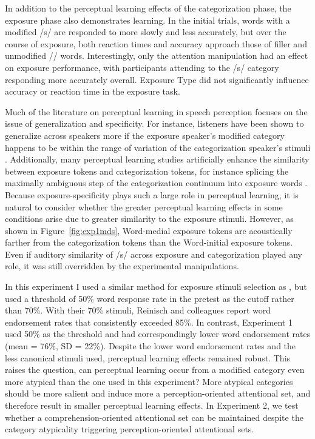 In addition to the perceptual learning effects of the categorization phase, the exposure phase also demonstrates learning.  
In the initial trials, words with a modified /s/ are responded to more slowly and less accurately, but over the course of exposure, both reaction times and accuracy approach those of filler and unmodified /\textesh/ words.
Interestingly, only the attention manipulation had an effect on exposure performance, with participants attending to the /s/ category responding more accurately overall.
Exposure Type did not significantly influence accuracy or reaction time in the exposure task.

Much of the literature on perceptual learning in speech perception focuses on the issue of generalization and specificity.
For instance, listeners have been shown to generalize across speakers more if the exposure speaker's modified category happens to be within the range of variation of the categorization speaker's stimuli \citep{Eisner2005,Kraljic2005}.
Additionally, many perceptual learning studies artificially enhance the similarity between exposure tokens and categorization tokens, for instance splicing the maximally ambiguous step of the categorization continuum into exposure words \citep{Norris2003}.
Because exposure-specificity plays such a large role in perceptual learning, it is natural to consider whether the greater perceptual learning effects in some conditions arise due to greater similarity to the exposure stimuli.
However, as shown in Figure~\ref{fig:exp1mds}, Word-medial exposure tokens are acoustically farther from the categorization tokens than the Word-initial exposure tokens.  
Even if auditory similarity of /s/ across exposure and categorization played any role, it was still overridden by the experimental manipulations.

In this experiment I used a similar method for exposure stimuli selection as \citet{Reinisch2013}, but used a threshold of 50\% word response rate in the pretest as the cutoff rather than 70\%.
With their 70\% stimuli, Reinisch and colleagues report word endorsement rates that consistently exceeded 85\%.
In contrast, Experiment 1 used 50\% as the threshold and had correspondingly lower word endorsement rates (mean = 76\%, SD = 22\%).  
Despite the lower word endorsement rates and the less canonical stimuli used, perceptual learning effects remained robust.
This raises the question, can perceptual learning occur from a modified category even more atypical than the one used in this experiment?
More atypical categories should be more salient and induce more a perception-oriented attentional set, and therefore result in smaller perceptual learning effects.
In Experiment 2, we test whether a comprehension-oriented attentional set can be maintained despite the category atypicality triggering perception-oriented attentional sets.


